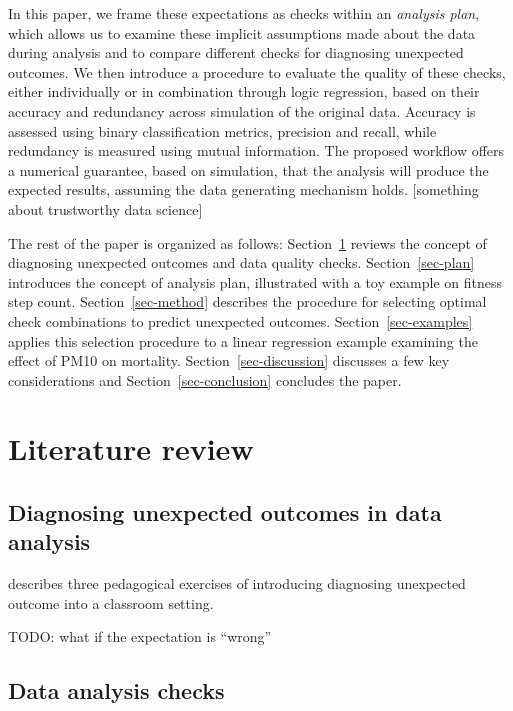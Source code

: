 \documentclass[
]{jds}
\begin{document}
In this paper, we frame these expectations as checks within an
\emph{analysis plan}, which allows us to examine these implicit
assumptions made about the data during analysis and to compare different
checks for diagnosing unexpected outcomes. We then introduce a procedure
to evaluate the quality of these checks, either individually or in
combination through logic regression, based on their accuracy and
redundancy across simulation of the original data. Accuracy is assessed
using binary classification metrics, precision and recall, while
redundancy is measured using mutual information. The proposed workflow
offers a numerical guarantee, based on simulation, that the analysis
will produce the expected results, assuming the data generating
mechanism holds. {[}something about trustworthy data science{]}

The rest of the paper is organized as follows:
Section~\ref{sec-lit-review} reviews the concept of diagnosing
unexpected outcomes and data quality checks. Section~\ref{sec-plan}
introduces the concept of analysis plan, illustrated with a toy example
on fitness step count. Section~\ref{sec-method} describes the procedure
for selecting optimal check combinations to predict unexpected outcomes.
Section~\ref{sec-examples} applies this selection procedure to a linear
regression example examining the effect of PM10 on mortality.
Section~\ref{sec-discussion} discusses a few key considerations and
Section~\ref{sec-conclusion} concludes the paper.

\section{Literature review}\label{sec-lit-review}

\subsection{Diagnosing unexpected outcomes in data
analysis}\label{diagnosing-unexpected-outcomes-in-data-analysis}

\citep{peng_diagnosing_2021} describes three pedagogical exercises of
introducing diagnosing unexpected outcome into a classroom setting.

TODO: what if the expectation is ``wrong''

\subsection{Data analysis checks}\label{data-analysis-checks}
\end{document}
